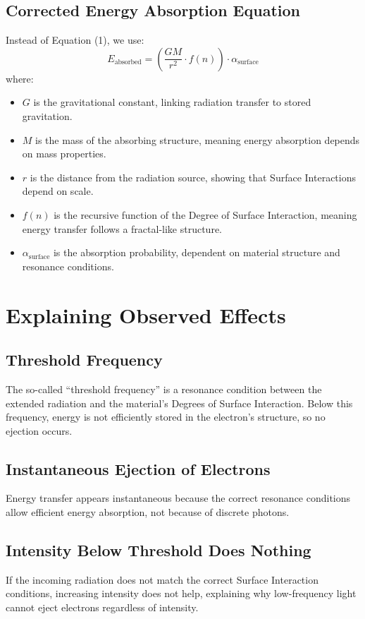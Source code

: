 \documentclass{article}
\begin{document}
\subsection{Corrected Energy Absorption Equation}
Instead of Equation (1), we use:
\begin{equation}
    E_{\text{absorbed}} = \left( \frac{G M}{r^2} \cdot f(n) \right) \cdot \alpha_{\text{surface}}
\end{equation}
where:
\begin{itemize}
    \item $G$ is the gravitational constant, linking radiation transfer to stored gravitation.
    \item $M$ is the mass of the absorbing structure, meaning energy absorption depends on mass properties.
    \item $r$ is the distance from the radiation source, showing that Surface Interactions depend on scale.
    \item $f(n)$ is the recursive function of the Degree of Surface Interaction, meaning energy transfer follows a fractal-like structure.
    \item $\alpha_{\text{surface}}$ is the absorption probability, dependent on material structure and resonance conditions.
\end{itemize}

\section{Explaining Observed Effects}
\subsection{Threshold Frequency}
The so-called ``threshold frequency'' is a resonance condition between the extended radiation and the material's Degrees of Surface Interaction. Below this frequency, energy is not efficiently stored in the electron’s structure, so no ejection occurs.

\subsection{Instantaneous Ejection of Electrons}
Energy transfer appears instantaneous because the correct resonance conditions allow efficient energy absorption, not because of discrete photons.

\subsection{Intensity Below Threshold Does Nothing}
If the incoming radiation does not match the correct Surface Interaction conditions, increasing intensity does not help, explaining why low-frequency light cannot eject electrons regardless of intensity.
\end{document}
